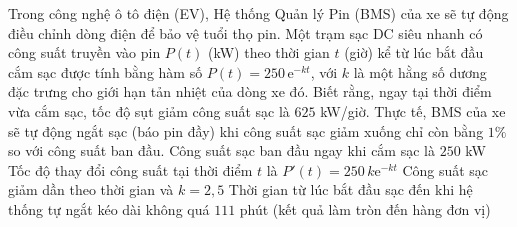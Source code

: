 \begin{ex}%
	Trong công nghệ ô tô điện (EV), Hệ thống Quản lý Pin (BMS) của xe sẽ tự động điều chỉnh dòng	điện để bảo vệ tuổi thọ pin. Một trạm sạc DC siêu nhanh có công suất truyền vào pin $P(t)$ (kW) theo thời gian $t$ (giờ) kể từ lúc bắt đầu cắm sạc được tính bằng hàm số $P(t)=250\,\mathrm{e}^{-kt}$, với $k$ là một hằng số dương đặc trưng cho giới hạn tản nhiệt của dòng xe đó. Biết rằng, ngay tại thời điểm vừa cắm sạc, tốc độ sụt giảm công suất sạc là $625$ kW/giờ. Thực tế, BMS của xe sẽ tự động ngắt sạc (báo pin đầy) khi công suất sạc giảm xuống chỉ còn bằng $1\%$ so với công suất ban đầu.
	\choiceTF
	{\True Công suất sạc ban đầu ngay khi cắm sạc là $250$ kW}
	{Tốc độ thay đổi công suất tại thời điểm $t$ là $P'(t)=250\,k\mathrm{e}^{-kt}$}
	{\True Công suất sạc giảm dần theo thời gian và $k=2{,}5$}
	{\True Thời gian từ lúc bắt đầu sạc đến khi hệ thống tự ngắt kéo dài không quá $111$ phút (kết quả làm tròn đến hàng đơn vị)}
\end{ex}

